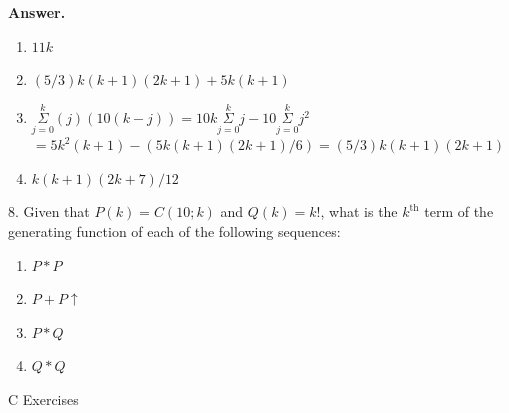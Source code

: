 \documentclass[10pt,]{book}
\theoremstyle{plain}
\theoremstyle{definition}
\theoremstyle{definition}
\theoremstyle{definition}
\theoremstyle{definition}
\numberwithin{equation}{section}
\begin{document}
\begin{exercisegroup}
\par\smallskip
\noindent\textbf{Answer.}\hypertarget{answer-7}{}\quad
\leavevmode%
\begin{enumerate}[label=\alph*]
\item\hypertarget{li-142}{} \(11k\)%
\item\hypertarget{li-143}{} \((5/3)k(k+1)(2k+1)+5k(k+1)\)%
\item\hypertarget{li-144}{} \(\underset{j=0}{\overset{k}{\Sigma }}(j)(10(k-j))=10k\underset{j=0}{\overset{k}{\Sigma }}j-10\underset{j=0}{\overset{k}{\Sigma }}j^2\)
    \(=5k^2(k+1)-(5k(k+1)(2k+1)/6)
=(5/3)k(k+1)(2k+1)\)%
\item\hypertarget{li-145}{} \(k(k+1)(2k+7)/12\)%
\end{enumerate}
%
\item[8.]\hypertarget{exercise-14}{}Given that \(P(k) = C(10;k)\) and \(Q(k) = k!\), what is the \(k^{\text{th}}\) term of the generating function of each of the following sequences:%
\par
\leavevmode%
\begin{enumerate}[label=\alph*]
\item\hypertarget{li-146}{}\(P * P\)%
\item\hypertarget{li-147}{}\(P + P\uparrow\)%
\item\hypertarget{li-148}{}\(P * Q\)%
\item\hypertarget{li-149}{} \(Q * Q\)%
\end{enumerate}
%
\par\smallskip
\end{exercisegroup}
\par\smallskip\noindent
\hypertarget{exercisegroup-5}{}\typeout{************************************************}
\typeout{************************************************}
C Exercises%
\end{document}
